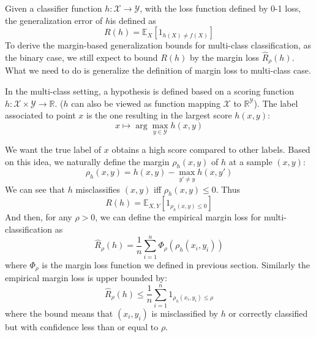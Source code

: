 Given a classifier function $h : \mathcal{X} \to \mathcal{Y}$, with the loss function defined by 0-1 loss, the generalization error of $h$is defined as
\begin{equation}
R(h) = \mathbb{E}_{X}[1_{h(X)\ne f(X)}]
\end{equation}
To derive the margin-based generalization bounds for multi-class classification, as the binary case, we still expect to bound $R(h)$ by the margin loss $\hat{R}_{\rho}(h)$. What we need to do is generalize the definition of margin loss to multi-class case.

In the multi-class setting, a hypothesis is defined based on a scoring function $h: \mathcal{X} \times \mathcal{Y} \to \mathbb{R}$. ($h$ can also be viewed as function mapping $\mathcal{X}$ to $\mathbb{R}^\mathcal{Y}$). The label associated to point $x$ is the one resulting in the largest score $h(x, y)$:
\begin{equation}
x \mapsto \arg\max_{y\in \mathcal{Y}}h(x,y)
\end{equation}

We want the true label of $x$ obtains a high score compared to other labels. Based on this idea, we naturally define the margin $\rho_h(x, y)$ of $h$ at a sample $(x, y)$:
\begin{equation}
\rho_h(x,y) = h(x,y) - \max_{y'\ne y}h(x,y')
\end{equation}
We can see that $h$ misclassifies $(x, y)$ iff $\rho_h(x, y) \leq 0$. Thus
\begin{equation}
R(h) = \mathbb{E}_{X,Y}[1_{\rho_h(x, y) \leq 0}] 
\end{equation}
And then, for any $\rho > 0$, we can define the empirical margin loss for multi-classification as
\begin{equation}
\hat{R}_{\rho}(h) = \frac{1}{n} \sum_{i=1}^{n}\Phi_{\rho}(\rho_h(x_i, y_i))
\end{equation}  
where $\Phi_{\rho}$ is the margin loss function we defined in previous section. Similarly the empirical margin loss is upper bounded by:
\begin{equation}
\hat{R}_{\rho}(h) \leq \frac{1}{n} \sum_{i=1}^{n} 1_{\rho_h(x_i, y_i) \leq \rho}
\end{equation}
where the bound means that $(x_i,y_i)$ is misclassified by $h$ or correctly classified but with confidence less than or equal
to $\rho$.\\

